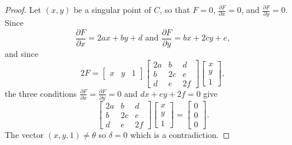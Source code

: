 \begin{proof}
    Let $(x, y)$ be a singular point of $C$, so that $F = 0$, $\frac{\partial F}{\partial x} = 0$,
    and $\frac{\partial F}{\partial y} = 0$. Since
    \[\frac{\partial F}{\partial x} = 2ax + by + d \text{ and } \frac{\partial F}{\partial y} = bx + 2cy + e,\]
    and since
    \[
    2F =
    \begin{bmatrix}
        x & y & 1
    \end{bmatrix}
    \begin{bmatrix}
        2a & b & d \\
        b & 2c & e \\
        d & e & 2f
    \end{bmatrix}
    \begin{bmatrix}
        x \\ y \\ 1
    \end{bmatrix},
    \]
    the three conditions $\frac{\partial F}{\partial x} = \frac{\partial F}{\partial y} = 0$ and $dx + ey + 2f = 0$ give
    \[
    \begin{bmatrix}
        2a & b & d \\
        b & 2c & e \\
        d & e & 2f
    \end{bmatrix}
    \begin{bmatrix}
        x \\ y \\ 1
    \end{bmatrix}
    =
    \begin{bmatrix}
        0 \\ 0 \\ 0
    \end{bmatrix}.
    \]
    The vector $(x, y, 1) \ne \theta$ so $\delta = 0$ which is a contradiction.
\end{proof}


